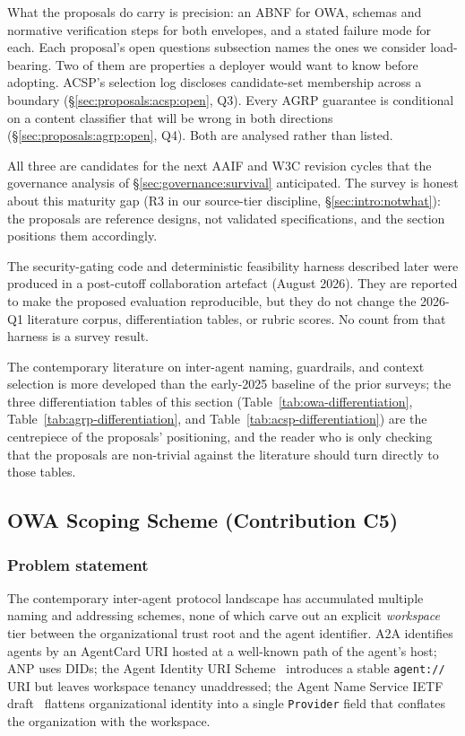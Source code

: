 What the proposals do carry is precision: an ABNF for OWA,
schemas and normative verification steps for both envelopes,
and a stated failure mode for each. Each proposal's open
questions subsection names the ones we consider
load-bearing. Two of them are properties a deployer would
want to know before adopting. ACSP's selection log discloses
candidate-set membership across a boundary
(\S\ref{sec:proposals:acsp:open}, Q3). Every AGRP guarantee
is conditional on a content classifier that will be wrong in
both directions (\S\ref{sec:proposals:agrp:open}, Q4). Both
are analysed rather than listed.

All three are candidates for the next AAIF and W3C revision
cycles that the governance analysis of
\S\ref{sec:governance:survival} anticipated. The survey is
honest about this maturity gap (R3 in our source-tier
discipline, \S\ref{sec:intro:notwhat}): the proposals are
reference designs, not validated specifications, and the
section positions them accordingly.

The security-gating code and deterministic feasibility
harness described later were produced in a post-cutoff
collaboration artefact (August 2026). They are reported to
make the proposed evaluation reproducible, but they do not
change the 2026-Q1 literature corpus, differentiation
tables, or rubric scores. No count from that harness is a
survey result.

The contemporary literature on inter-agent naming,
guardrails, and context selection is more developed than
the early-2025 baseline of the prior surveys; the three
differentiation tables of this section
(Table~\ref{tab:owa-differentiation},
Table~\ref{tab:agrp-differentiation}, and
Table~\ref{tab:acsp-differentiation}) are the centrepiece
of the proposals' positioning, and the reader who is only
checking that the proposals are non-trivial against the
literature should turn directly to those tables.

\subsection{OWA Scoping Scheme (Contribution C5)}
\label{sec:proposals:owa}

\subsubsection{Problem statement}
\label{sec:proposals:owa:problem}

The contemporary inter-agent protocol landscape has
accumulated multiple naming and addressing schemes, none of
which carve out an explicit \emph{workspace} tier between
the organizational trust root and the agent identifier. A2A
identifies agents by an AgentCard URI hosted at a
well-known path of the agent's host; ANP uses DIDs; the
Agent Identity URI Scheme~\cite{agent_uri_scheme} introduces
a stable \texttt{agent://} URI but leaves workspace
tenancy unaddressed; the Agent Name Service IETF
draft~\cite{ans_ietf} flattens organizational identity into
a single \texttt{Provider} field that conflates the
organization with the workspace.

